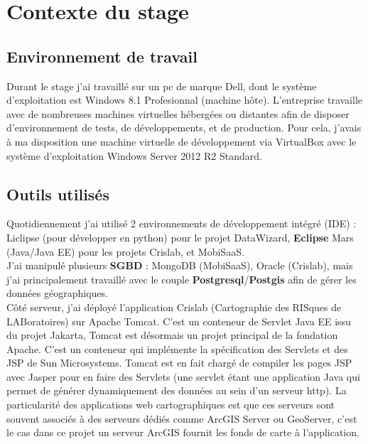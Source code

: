 \chapter{Contexte du stage}
\label{AnalyseConception}

\section{Environnement de travail}

Durant le stage j'ai travaillé sur un pc de marque Dell, dont le système d'exploitation est Windows 8.1 Profesionnal (machine hôte). L'entreprise travaille avec de nombreuses machines virtuelles hébergées ou distantes afin de disposer d'environnement de tests, de développements, et de production. Pour cela, j'avais à ma disposition une machine virtuelle de développement via VirtualBox avec le système d'exploitation Windows Server 2012 R2 Standard. \\

\section{Outils utilisés}

Quotidiennement j'ai utilisé 2 environnements de développement intégré (IDE) : Liclipse (pour développer en python) pour le projet DataWizard, \textbf{Eclipse} Mars (Java/Java EE) pour les projets Crislab, et MobiSaaS.\\

J'ai manipulé plusieurs \textbf{SGBD} : MongoDB (MobiSaaS), Oracle (Crislab), mais j'ai principalement travaillé avec le couple \textbf{Postgresql}/\textbf{Postgis} afin de gérer les données géographiques.\\

Côté serveur, j'ai déployé l'application Crislab (Cartographie des RISques de LABoratoires) sur Apache Tomcat. C'est un conteneur de Servlet Java EE issu du projet Jakarta, Tomcat est désormais un projet principal de la fondation Apache. C’est un conteneur qui implémente la spécification des Servlets et des JSP de Sun Microsystems. Tomcat est en fait chargé de compiler les pages JSP avec Jasper pour en faire des Servlets (une servlet étant une application Java qui permet de générer dynamiquement des données au sein d’un serveur http). La particularité des applications web cartographiques est que ces serveurs sont souvent associés à des serveurs dédiés comme ArcGIS Server ou GeoServer, c'est le cas dans ce projet un serveur ArcGIS fournit les fonds de carte à l'application.

